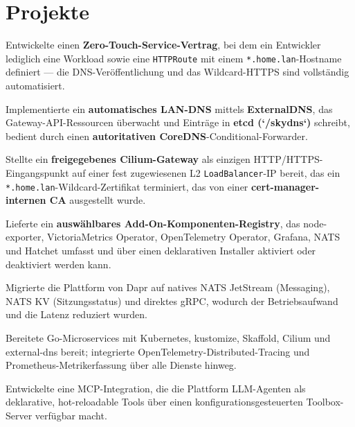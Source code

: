\documentclass[10pt,a4paper]{resume}
\begin{document}
\vspace{2pt}

\section{Projekte}

\bullets
  \item Entwickelte einen \textbf{Zero-Touch-Service-Vertrag}, bei dem ein Entwickler lediglich eine Workload sowie eine \texttt{HTTPRoute} mit einem \texttt{*.home.lan}-Hostname definiert — die DNS-Veröffentlichung und das Wildcard-HTTPS sind vollständig automatisiert.
  \item Implementierte ein \textbf{automatisches LAN-DNS} mittels \textbf{ExternalDNS}, das Gateway-API-Ressourcen überwacht und Einträge in \textbf{etcd (`/skydns`)} schreibt, bedient durch einen \textbf{autoritativen CoreDNS}-Conditional-Forwarder.
  \item Stellte ein \textbf{freigegebenes Cilium-Gateway} als einzigen HTTP/HTTPS-Eingangspunkt auf einer fest zugewiesenen L2 \texttt{LoadBalancer}-IP bereit, das ein \texttt{*.home.lan}-Wildcard-Zertifikat terminiert, das von einer \textbf{cert-manager-internen CA} ausgestellt wurde.
  \item Lieferte ein \textbf{auswählbares Add-On-Komponenten-Registry}, das node-exporter, VictoriaMetrics Operator, OpenTelemetry Operator, Grafana, NATS und Hatchet umfasst und über einen deklarativen Installer aktiviert oder deaktiviert werden kann.
\bulletsend
\vspace{1.0pt}
\bullets
  \item Migrierte die Plattform von Dapr auf natives NATS JetStream (Messaging), NATS KV (Sitzungsstatus) und direktes gRPC, wodurch der Betriebsaufwand und die Latenz reduziert wurden.
  \item Bereitete Go-Microservices mit Kubernetes, kustomize, Skaffold, Cilium und external-dns bereit; integrierte OpenTelemetry-Distributed-Tracing und Prometheus-Metrikerfassung über alle Dienste hinweg.
  \item Entwickelte eine MCP-Integration, die die Plattform LLM-Agenten als deklarative, hot-reloadable Tools über einen konfigurationsgesteuerten Toolbox-Server verfügbar macht.
\bulletsend
\end{document}
